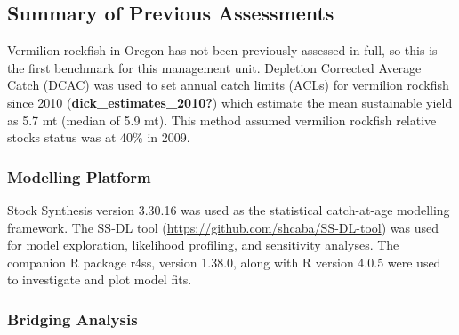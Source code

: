 \documentclass[11pt,
  english,
  a4paper,
]{article}
\begin{document}
\leavevmode\tagmcend\tagstructend


\hypertarget{summary-of-previous-assessments}{%
\subsection{Summary of Previous Assessments}\label{summary-of-previous-assessments}}

\leavevmode\tagmcend\tagstructend


Vermilion rockfish in Oregon has not been previously assessed in full, so this is the first benchmark for this management unit. Depletion Corrected Average Catch (DCAC) was used to set annual catch limits (ACLs) for vermilion rockfish since 2010 {(\textbf{dick\_estimates\_2010?})\leavevmode\tagmcend\tagstructend} which estimate the mean sustainable yield as 5.7 mt (median of 5.9 mt). This method assumed vermilion rockfish relative stocks status was at 40\% in 2009.

\leavevmode\tagmcend\tagstructend\par


\hypertarget{modelling-platform}{%
\subsubsection{Modelling Platform}\label{modelling-platform}}

\leavevmode\tagmcend\tagstructend


Stock Synthesis version 3.30.16 was used as the statistical catch-at-age modelling framework. The SS-DL tool ({\url{https://github.com/shcaba/SS-DL-tool}\leavevmode\tagmcend\tagstructend}) was used for model exploration, likelihood profiling, and sensitivity analyses. The companion R package r4ss, version 1.38.0, along with R version 4.0.5 were used to investigate and plot model fits.

\leavevmode\tagmcend\tagstructend\par


\hypertarget{bridging-analysis}{%
\subsubsection{Bridging Analysis}\label{bridging-analysis}}
\end{document}
